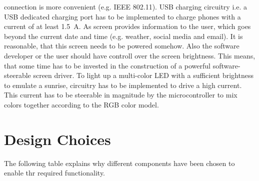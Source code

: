 connection is more convenient (e.g. IEEE 802.11).  \newpar USB charging
circuitry i.e. a USB dedicated charging port has to be implemented to charge
phones with a current of at least \SI{1.5}{A}.  \newpar As screen provides
information to the user, which goes beyond the current date and time (e.g.
weather, social media and email). It is reasonable, that this screen needs to be
powered somehow. Also the software developer or the user should have controll
over the screen brightness.  This means, that some time has to be invested in
the construction of a powerful software-steerable screen driver.  \newpar To
light up a multi-color LED with a sufficient brightness to emulate a sunrise,
circuitry has to be implemented to drive a high current. This current has to be
steerable in magnitude by the microcontroller to mix colors together according
to the RGB color model. 

\section{Design Choices}

The following table explains why different components have been chosen to enable thr required functionality.

